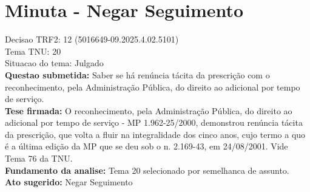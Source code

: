 \documentclass{article}
\begin{document}
\section*{Minuta - Negar Seguimento}
Decisao TRF2: 12 (5016649-09.2025.4.02.5101)\\
Tema TNU: 20\\
Situacao do tema: Julgado\\
\textbf{Questao submetida:} Saber se há renúncia tácita da prescrição com o reconhecimento, pela Administração Pública, do direito ao adicional por tempo de serviço.\\
\textbf{Tese firmada:} O reconhecimento, pela Administração Pública, do direito ao adicional por tempo de serviço - MP 1.962-25/2000, demonstrou renúncia tácita da prescrição, que volta a fluir na integralidade dos cinco anos, cujo termo a quo é a última edição da MP que se deu sob o n. 2.169-43, em 24/08/2001. Vide Tema 76 da TNU.\\
\textbf{Fundamento da analise:} Tema 20 selecionado por semelhanca de assunto.\\
\textbf{Ato sugerido:} Negar Seguimento
\end{document}

